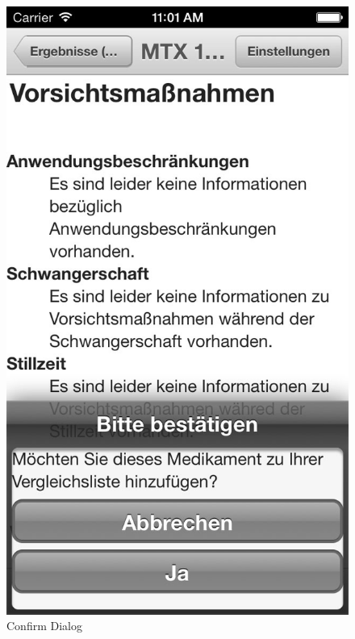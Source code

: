 \begin{figure}[!ptb]
\begin{minipage}[b]{0.45\linewidth}
        \includegraphics[width=0.8025\linewidth]{figures/Dialog_bw.jpg}
        \caption[Confirm Action Dialog]{Confirm Dialog}
        \label{fig:ConfirmDialog}
    \end{minipage}
    \hspace{0.5cm}
    \begin{minipage}[b]{0.45\linewidth}
        \centering

\end{minipage}
\end{figure}
